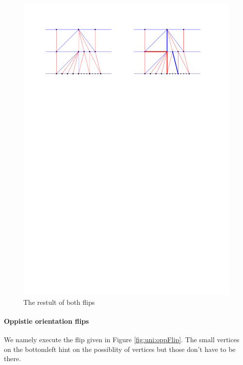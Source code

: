  \begin{figure}[h]
   \centering
   \includegraphics[width =\textwidth]{unifiedAlgo/img/post/sameFlipComplete}
   \caption{The restult of both flips}
   \label{fig:uni:sameFlipComplete}
 \end{figure}



 \paragraph{Oppistie orientation flips}
 We namely execute the flip given in Figure \ref{fig:uni:oppFlip}. The small vertices on the bottomleft hint on the possiblity of vertices but those don't have to be there.

